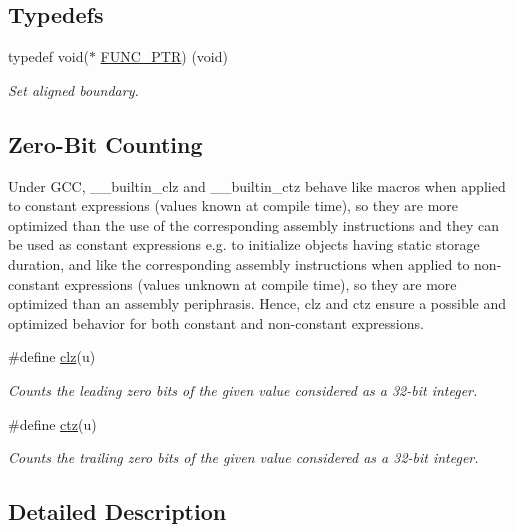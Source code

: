 \subsection*{Typedefs}
\begin{DoxyCompactItemize}
\item 
typedef void($\ast$ \hyperlink{group__doc__driver__hal__utils__macro_gae40b38bc5f5a5bd452bdd59c67d9a9cf}{F\+U\+N\+C\+\_\+\+P\+TR}) (void)
\begin{DoxyCompactList}\small\item\em Set aligned boundary. \end{DoxyCompactList}\end{DoxyCompactItemize}
\subsection*{Zero-\/\+Bit Counting}
\label{_amgrpd7e64f1bf7ad6347e17b23a92fc56d83}%
Under G\+CC, \+\_\+\+\_\+builtin\+\_\+clz and \+\_\+\+\_\+builtin\+\_\+ctz behave like macros when applied to constant expressions (values known at compile time), so they are more optimized than the use of the corresponding assembly instructions and they can be used as constant expressions e.\+g. to initialize objects having static storage duration, and like the corresponding assembly instructions when applied to non-\/constant expressions (values unknown at compile time), so they are more optimized than an assembly periphrasis. Hence, clz and ctz ensure a possible and optimized behavior for both constant and non-\/constant expressions. \begin{DoxyCompactItemize}
\item 
\#define \hyperlink{group__doc__driver__hal__utils__macro_ga004f88903a09b9c23017e697eaf5a845}{clz}(u)
\begin{DoxyCompactList}\small\item\em Counts the leading zero bits of the given value considered as a 32-\/bit integer. \end{DoxyCompactList}\item 
\#define \hyperlink{group__doc__driver__hal__utils__macro_gab069bfec305db5213465d3b689836404}{ctz}(u)
\begin{DoxyCompactList}\small\item\em Counts the trailing zero bits of the given value considered as a 32-\/bit integer. \end{DoxyCompactList}\end{DoxyCompactItemize}


\subsection{Detailed Description}


